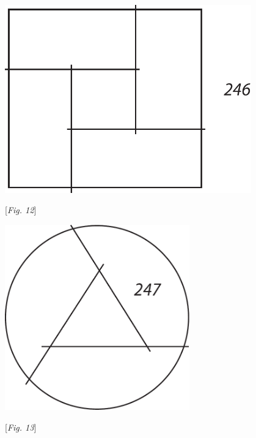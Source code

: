 \rule[-4mm]{0mm}{10mm}\label{LH35,14,02_119v_ref-1}
\pend
\newpage %
\pstart
\begin{minipage}[t]{0.5\textwidth}
\hspace*{-10mm}
\includegraphics[width=0.8\textwidth]{images/LH035,14,02_119v-d5.pdf}\\
\rule[-4mm]{0mm}{10mm}\noindent\centering\hspace*{-20mm}[\textit{Fig. 12}]
\end{minipage}
\hspace*{-5mm}
\begin{minipage}[t]{0.5\textwidth}
\includegraphics[width=0.60\textwidth]{images/LH035,14,02_119v-d6.pdf}\\
\rule[-4mm]{0mm}{10mm}\noindent\centering\hspace*{-6mm}[\textit{Fig. 13}]
\end{minipage}
